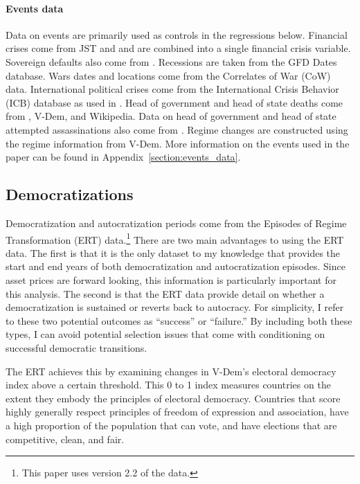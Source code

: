 \paragraph{Events data}\label{section:eventsapp}
Data on events are primarily used as controls in the regressions below. Financial crises come from JST and \cite*{Reinhart2009} and are combined into a single financial crisis variable. Sovereign defaults also come from \cite*{Reinhart2009}. Recessions are taken from the GFD Dates database. Wars dates and locations come from the Correlates of War (CoW) data. International political crises come from the International Crisis Behavior (ICB) database as used in \cite*{Berkman2011}. Head of government and head of state deaths come from \cite*{Jones2009}, V-Dem, and Wikipedia. Data on head of government and head of state attempted assassinations also come from \cite*{Jones2009}. Regime changes are constructed using the regime information from V-Dem. More information on the events used in the paper can be found in Appendix~\ref{section:events_data}.

\subsection{Democratizations}\label{section:democratization_data}

Democratization and autocratization periods come from the Episodes of Regime Transformation (ERT) data.\footnote{This paper uses version 2.2 of the data.} There are two main advantages to using the ERT data. The first is that it is the only dataset to my knowledge that provides the start and end years of both democratization and autocratization episodes. Since asset prices are forward looking, this information is particularly important for this analysis. The second is that the ERT data provide detail on whether a democratization is sustained or reverts back to autocracy. For simplicity, I refer to these two potential outcomes as ``success'' or ``failure.'' By including both these types, I can avoid potential selection issues that come with conditioning on successful democratic transitions.

The ERT achieves this by examining changes in V-Dem's electoral democracy index above a certain threshold. This 0 to 1 index measures countries on the extent they embody the principles of electoral democracy. Countries that score highly generally respect principles of freedom of expression and association, have a high proportion of the population that can vote, and have elections that are competitive, clean, and fair. 

